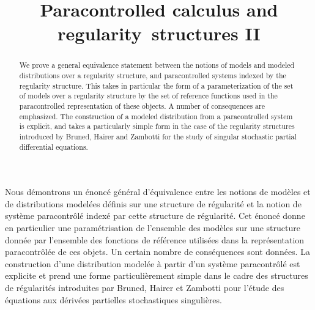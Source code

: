 \documentclass[JEP,XML,SOM,Unicode,published]{cedram}
\theoremstyle{plain}
\theoremstyle{definition}
\begin{document}
\title{Paracontrolled calculus and regularity~structures II}

\author[\initial{I.} \lastname{Bailleul}]{ }
\address{Univ. Rennes, CNRS, IRMAR - UMR 6625\\
263 avenue du General Leclerc, 35042 Rennes, France}

\author[\initial{M.} \lastname{Hoshino}]{ }
\address{Graduate School of Engineering Science, Osaka University\\
1-3, Machikaneyama, Toyonaka, Osaka, 560-8531, Japan}

\begin{abstract}
We prove a general equivalence statement between the notions of models and modeled distributions over a regularity structure, and paracontrolled systems indexed by the regularity structure. This takes in particular the form of a parameterization of the set of models over a regularity structure by the set of reference functions used in the paracontrolled representation of these objects. A number of consequences are emphasized. The construction of a modeled distribution from a paracontrolled system is explicit, and takes a particularly simple form in the case of the regularity structures introduced by Bruned, Hairer and Zambotti for the study of singular stochastic partial differential equations.
\end{abstract}





\begin{altabstract}
Nous démontrons un énoncé général d'équivalence entre les notions de modèles et de distributions modelées définis sur une structure de régularité et la notion de système paracontrôlé indexé par cette structure de régularité. Cet énoncé donne en particulier une paramétrisation de l'ensemble des modèles sur une structure donnée par l'ensemble des fonctions de référence utilisées dans la représentation paracontrôlée de ces objets. Un certain nombre de conséquences sont données. La construction d'une distribution modelée à partir d'un système paracontrôlé est explicite et prend une forme particulièrement simple dans le cadre des structures de régularités introduites par Bruned, Hairer et Zambotti pour l'étude des équations aux dérivées partielles stochastiques singulières.
\end{altabstract}
\end{document}
